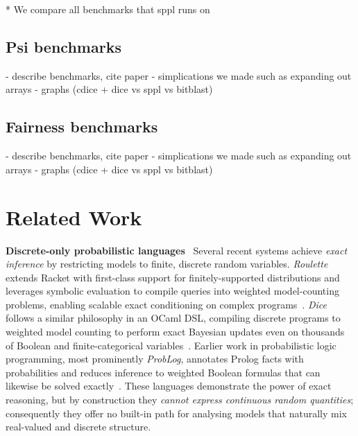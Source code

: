 \documentclass[acmsmall,screen,dvipsnames,x11names,nonacm,anonymous,review]{acmart}
\renewcommand{\paragraph}[1]{\vspace{1em}\noindent\textbf{#1}\ }
\begin{document}
* We compare all benchmarks that sppl runs on
\subsection{Psi benchmarks}\label{sec:psi-benchmarks}
- describe benchmarks, cite paper
- simplications we made such as expanding out arrays
- graphs (cdice + dice vs sppl vs bitblast)

\subsection{Fairness benchmarks}\label{sec:fairness-benchmarks}
- describe benchmarks, cite paper
- simplications we made such as expanding out arrays
- graphs (cdice + dice vs sppl vs bitblast)





\section{Related Work}
\label{sec:related}

\paragraph{Discrete-only probabilistic languages}  
Several recent systems achieve \emph{exact inference} by restricting models to finite, discrete random variables. \emph{Roulette} extends Racket with first-class support for finitely-supported distributions and leverages symbolic evaluation to compile queries into weighted model-counting problems, enabling scalable exact conditioning on complex programs~\cite{Moy2025Roulette}. \emph{Dice} follows a similar philosophy in an OCaml DSL, compiling discrete programs to weighted model counting to perform exact Bayesian updates even on thousands of Boolean and finite-categorical variables~\cite{Holtzen2020Dice}. Earlier work in probabilistic logic programming, most prominently \emph{ProbLog}, annotates Prolog facts with probabilities and reduces inference to weighted Boolean formulas that can likewise be solved exactly~\cite{DeRaedt2007ProbLog}. These languages demonstrate the power of exact reasoning, but by construction they \emph{cannot express continuous random quantities}; consequently they offer no built-in path for analysing models that naturally mix real-valued and discrete structure.  
\end{document}

